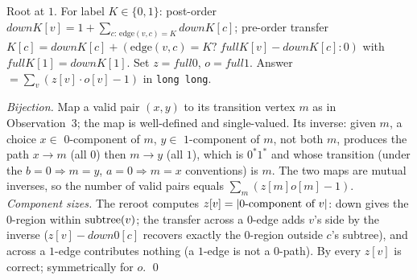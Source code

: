 Root at $1$. For label $K\in\{0,1\}$: post-order
$\mathit{down}K[v]=1+\sum_{c:\,\text{edge}(v,c)=K}\mathit{down}K[c]$; pre-order
transfer $K[c]=\mathit{down}K[c]+(\text{edge}(v,c)=K?\;\mathit{full}K[v]-\mathit{down}K[c]:0)$
with $\mathit{full}K[1]=\mathit{down}K[1]$. Set $z=\mathit{full}0$,
$o=\mathit{full}1$. Answer $=\sum_{v} (z[v]\cdot o[v]-1)$ in
\lstinline{long long}.

\begin{proofbox}
\emph{Bijection.} Map a valid pair $(x,y)$ to its transition vertex $m$ as in
Observation~3; the map is well-defined and single-valued. Its inverse: given
$m$, a choice $x\in$ $0$-component of $m$, $y\in$ $1$-component of $m$, not both
$m$, produces the path $x\!\to\!m$ (all $0$) then $m\!\to\!y$ (all $1$), which
is $0^{\ast}1^{\ast}$ and whose transition (under the $b=0\Rightarrow m=y$,
$a=0\Rightarrow m=x$ conventions) is $m$. The two maps are mutual inverses, so
the number of valid pairs equals $\sum_m (z[m]o[m]-1)$. \emph{Component sizes.}
The reroot computes $z[v]=\lvert\text{$0$-component of $v$}\rvert$: down gives the
$0$-region within $\operatorname{subtree}(v)$; the transfer across a $0$-edge adds $v$'s side
by the inverse ($z[v]-\mathit{down}0[c]$ recovers exactly the $0$-region
outside $c$'s subtree), and across a $1$-edge contributes nothing (a $1$-edge is
not a $0$-path). By  every $z[v]$ is correct;
symmetrically for $o$. \qed
\end{proofbox}

